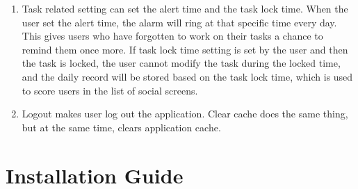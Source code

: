 \documentclass[conference]{IEEEtran}
\begin{document}
\begin{enumerate}
    \item Task related setting can set the alert time and the task lock time. When the user set the alert time, the alarm will ring at that specific time every day. This gives users who have forgotten to work on their tasks a chance to remind them once more. If task lock time setting is set by the user and then the task is locked, the user cannot modify the task during the locked time, and the daily record will be stored based on the task lock time, which is used to score users in the list of social screens.
    
    \item Logout makes user log out the application. Clear cache does the same thing, but at the same time, clears application cache.
    
\end{enumerate}

\section{Installation Guide}
\end{document}
